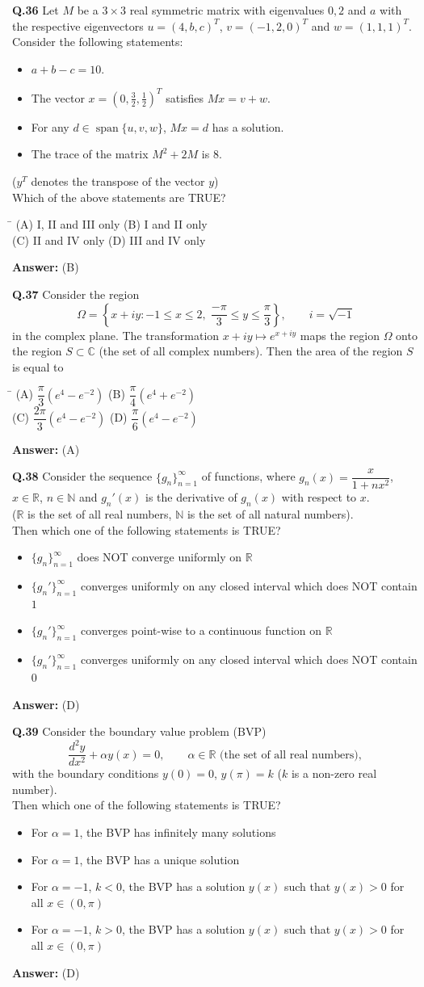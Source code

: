 \documentclass[11pt,a4paper]{article}
\newcommand{\optsfourA}[4]{%
  \begin{tabbing}
    \hspace{0.48\linewidth}\=\kill
    (A) #1 \> (B) #2 \\[2pt]
    (C) #3 \> (D) #4
  \end{tabbing}%
}
\newcommand{\optslistA}[4]{%
  \begin{itemize}
    \setlength{\itemsep}{2pt}\setlength{\parskip}{0pt}
    \item[(A)] #1
    \item[(B)] #2
    \item[(C)] #3
    \item[(D)] #4
  \end{itemize}%
}
\newcommand{\ans}[1]{\textbf{Answer:} #1\par\medskip}
\begin{document}
\textbf{Q.36} Let $M$ be a $3 \times 3$ real symmetric matrix with eigenvalues $0, 2$ and $a$ with the respective eigenvectors $u = (4, b, c)^T$, $v = (-1, 2, 0)^T$ and $w = (1, 1, 1)^T$.\\
Consider the following statements:
\begin{itemize}
  \setlength{\itemsep}{1pt}\setlength{\parskip}{0pt}
  \item[I.] $a + b - c = 10$.
  \item[II.] The vector $x = \left(0, \frac{3}{2}, \frac{1}{2}\right)^T$ satisfies $Mx = v + w$.
  \item[III.] For any $d \in \operatorname{span}\{u, v, w\}$, $Mx = d$ has a solution.
  \item[IV.] The trace of the matrix $M^2 + 2M$ is $8$.
\end{itemize}
($y^T$ denotes the transpose of the vector $y$)\\
Which of the above statements are TRUE?
\optsfourA{I, II and III only}{I and II only}{II and IV only}{III and IV only}
\ans{(B)}

\textbf{Q.37} Consider the region
\[
  \Omega = \left\{x + iy : -1 \le x \le 2,\; \frac{-\pi}{3} \le y \le \frac{\pi}{3}\right\}, \qquad i = \sqrt{-1}
\]
in the complex plane. The transformation $x + iy \mapsto e^{x+iy}$ maps the region $\Omega$ onto the region $S \subset \mathbb{C}$ (the set of all complex numbers). Then the area of the region $S$ is equal to
\optsfourA{$\dfrac{\pi}{3}(e^4 - e^{-2})$}{$\dfrac{\pi}{4}(e^4 + e^{-2})$}{$\dfrac{2\pi}{3}(e^4 - e^{-2})$}{$\dfrac{\pi}{6}(e^4 - e^{-2})$}
\ans{(A)}

\textbf{Q.38} Consider the sequence $\{g_n\}_{n=1}^{\infty}$ of functions, where $g_n(x) = \dfrac{x}{1 + nx^2}$, $x \in \mathbb{R}$, $n \in \mathbb{N}$ and $g_n'(x)$ is the derivative of $g_n(x)$ with respect to $x$.\\
($\mathbb{R}$ is the set of all real numbers, $\mathbb{N}$ is the set of all natural numbers).\\
Then which one of the following statements is TRUE?
\optslistA{$\{g_n\}_{n=1}^{\infty}$ does NOT converge uniformly on $\mathbb{R}$}{$\{g_n'\}_{n=1}^{\infty}$ converges uniformly on any closed interval which does NOT contain $1$}{$\{g_n'\}_{n=1}^{\infty}$ converges point-wise to a continuous function on $\mathbb{R}$}{$\{g_n'\}_{n=1}^{\infty}$ converges uniformly on any closed interval which does NOT contain $0$}
\ans{(D)}

\textbf{Q.39} Consider the boundary value problem (BVP)
\[
  \frac{d^2 y}{dx^2} + \alpha y(x) = 0, \qquad \alpha \in \mathbb{R} \text{ (the set of all real numbers)},
\]
with the boundary conditions $y(0) = 0$, $y(\pi) = k$ ($k$ is a non-zero real number).\\
Then which one of the following statements is TRUE?
\optslistA{For $\alpha = 1$, the BVP has infinitely many solutions}{For $\alpha = 1$, the BVP has a unique solution}{For $\alpha = -1$, $k < 0$, the BVP has a solution $y(x)$ such that $y(x) > 0$ for all $x \in (0, \pi)$}{For $\alpha = -1$, $k > 0$, the BVP has a solution $y(x)$ such that $y(x) > 0$ for all $x \in (0, \pi)$}
\ans{(D)}
\end{document}
